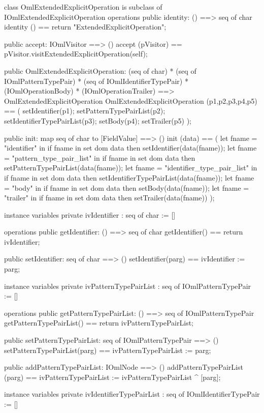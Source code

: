 \begin{vdm_al}
class OmlExtendedExplicitOperation is subclass of IOmlExtendedExplicitOperation
operations
  public identity: () ==> seq of char
  identity () == return "ExtendedExplicitOperation";

  public accept: IOmlVisitor ==> ()
  accept (pVisitor) == pVisitor.visitExtendedExplicitOperation(self);

  public OmlExtendedExplicitOperation:
      (seq of char) *
      (seq of IOmlPatternTypePair) *
      (seq of IOmlIdentifierTypePair) *
      (IOmlOperationBody) *
      (IOmlOperationTrailer) ==> OmlExtendedExplicitOperation
  OmlExtendedExplicitOperation (p1,p2,p3,p4,p5) == 
   ( setIdentifier(p1);
     setPatternTypePairList(p2);
     setIdentifierTypePairList(p3);
     setBody(p4);
     setTrailer(p5) );

  public init: map seq of char to [FieldValue] ==> ()
  init (data) ==
    ( let fname = "identifier" in
        if fname in set dom data
        then setIdentifier(data(fname));
      let fname = "pattern_type_pair_list" in
        if fname in set dom data
        then setPatternTypePairList(data(fname));
      let fname = "identifier_type_pair_list" in
        if fname in set dom data
        then setIdentifierTypePairList(data(fname));
      let fname = "body" in
        if fname in set dom data
        then setBody(data(fname));
      let fname = "trailer" in
        if fname in set dom data
        then setTrailer(data(fname)) );

instance variables
  private ivIdentifier : seq of char := []

operations
  public getIdentifier: () ==> seq of char
  getIdentifier() == return ivIdentifier;

  public setIdentifier: seq of char ==> ()
  setIdentifier(parg) == ivIdentifier := parg;

instance variables
  private ivPatternTypePairList : seq of IOmlPatternTypePair := []

operations
  public getPatternTypePairList: () ==> seq of IOmlPatternTypePair
  getPatternTypePairList() == return ivPatternTypePairList;

  public setPatternTypePairList: seq of IOmlPatternTypePair ==> ()
  setPatternTypePairList(parg) == ivPatternTypePairList := parg;

  public addPatternTypePairList: IOmlNode ==> ()
  addPatternTypePairList (parg) == ivPatternTypePairList := ivPatternTypePairList ^ [parg];

instance variables
  private ivIdentifierTypePairList : seq of IOmlIdentifierTypePair := []


\end{vdm_al}
